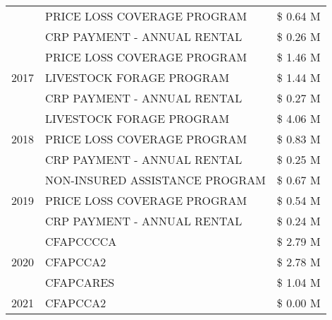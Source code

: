 \begin{tabular}{llr}
 & PRICE LOSS COVERAGE PROGRAM & \$ 0.64 M \\
 & CRP PAYMENT - ANNUAL RENTAL & \$ 0.26 M \\
\cline{1-3}
\multirow[t]{3}{*}{2017} & PRICE LOSS COVERAGE PROGRAM & \$ 1.46 M \\
 & LIVESTOCK FORAGE PROGRAM & \$ 1.44 M \\
 & CRP PAYMENT - ANNUAL RENTAL & \$ 0.27 M \\
\cline{1-3}
\multirow[t]{3}{*}{2018} & LIVESTOCK FORAGE PROGRAM & \$ 4.06 M \\
 & PRICE LOSS COVERAGE PROGRAM & \$ 0.83 M \\
 & CRP PAYMENT - ANNUAL RENTAL & \$ 0.25 M \\
\cline{1-3}
\multirow[t]{3}{*}{2019} & NON-INSURED ASSISTANCE PROGRAM & \$ 0.67 M \\
 & PRICE LOSS COVERAGE PROGRAM & \$ 0.54 M \\
 & CRP PAYMENT - ANNUAL RENTAL & \$ 0.24 M \\
\cline{1-3}
\multirow[t]{3}{*}{2020} & CFAPCCCCA & \$ 2.79 M \\
 & CFAPCCA2 & \$ 2.78 M \\
 & CFAPCARES & \$ 1.04 M \\
\cline{1-3}
2021 & CFAPCCA2 & \$ 0.00 M \\
\cline{1-3}
\bottomrule
\end{tabular}
